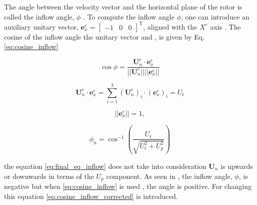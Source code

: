 The angle between the velocity vector and the horizontal plane of the rotor is called the inflow angle, $\phi$ . To compute the inflow angle $\phi$, one can introduce an auxiliary unitary vector, $\mathbf{e}_x^e = \begin{bmatrix} -1 & 0 & 0 \end{bmatrix}^\mathrm{T}$, aligned with the $X^e$ axis . The cosine of the inflow angle  the unitary vector and , is given by Eq. \ref{eq:cosine_inflow}

\begin{equation}
    \cos \phi = \frac{\mathbf{U}_n^e \cdot \mathbf{e}^e_x}{||\mathbf{U}_n^e|| ||\mathbf{e}_x^e||}
    \label{eq:cosine_inflow}
\end{equation}


\begin{equation}
    \mathbf{U}_n^e \cdot \mathbf{e}^e_x = \sum_ {i=1}^3 (\mathbf{U}_n^e)_i \cdot (\mathbf{e}_x^e)_i = U_t
\end{equation}

\noindent {}

\begin{equation}
    || \mathbf{e}^e_x || =  1,
    \label{eq:unitary_vec_norm}
\end{equation}

\noindent {}

\begin{equation}
    \phi_n = \cos^{-1} \left( \frac{U_t}{\sqrt{U_t^2 + U_p^2}}\right)
    \label{eq:final_eq_inflow}
\end{equation}

 the equation \ref{eq:final_eq_inflow} does not take into consideration   $\mathbf{U}_n$  is upwards or downwards in terms of the $U_p$ component. As seen in  , the inflow angle, $\phi$, is negative but when \ref{eq:cosine_inflow} is used , the angle is positive. For changing this equation \ref{eq:cosine_inflow_corrected} is introduced.

